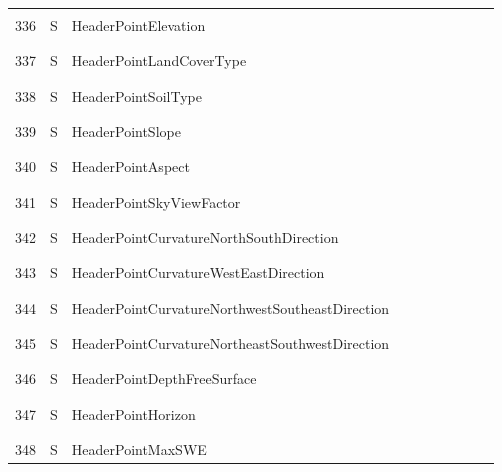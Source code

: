 \begin{longtable}{|c|c|l|c|c|c|c|p{}|c|p{}|}
&&&&&&&&&\\
336 & S & HeaderPointElevation & & & & & & & \\
&&&&&&&&&\\\hline%
&&&&&&&&&\\
337 & S & HeaderPointLandCoverType & & & & & & & \\
&&&&&&&&&\\\hline%
&&&&&&&&&\\
338 & S & HeaderPointSoilType & & & & & & & \\
&&&&&&&&&\\\hline%
&&&&&&&&&\\
339 & S & HeaderPointSlope & & & & & & & \\
&&&&&&&&&\\\hline%
&&&&&&&&&\\
340 & S & HeaderPointAspect & & & & & & & \\
&&&&&&&&&\\\hline%
&&&&&&&&&\\
341 & S & HeaderPointSkyViewFactor & & & & & & & \\
&&&&&&&&&\\\hline%
&&&&&&&&&\\
342 & S & HeaderPointCurvatureNorthSouthDirection & & & & & & & \\
&&&&&&&&&\\\hline%
&&&&&&&&&\\
343 & S & HeaderPointCurvatureWestEastDirection & & & & & & & \\
&&&&&&&&&\\\hline%
&&&&&&&&&\\
344 & S & HeaderPointCurvatureNorthwestSoutheastDirection & & & & & & & \\
&&&&&&&&&\\\hline%
&&&&&&&&&\\
345 & S & HeaderPointCurvatureNortheastSouthwestDirection & & & & & & & \\
&&&&&&&&&\\\hline%
&&&&&&&&&\\
346 & S & HeaderPointDepthFreeSurface & & & & & & & \\
&&&&&&&&&\\\hline%
&&&&&&&&&\\
347 & S & HeaderPointHorizon & & & & & & & \\
&&&&&&&&&\\\hline%
&&&&&&&&&\\
348 & S & HeaderPointMaxSWE & & & & & & & \\

\end{longtable}
